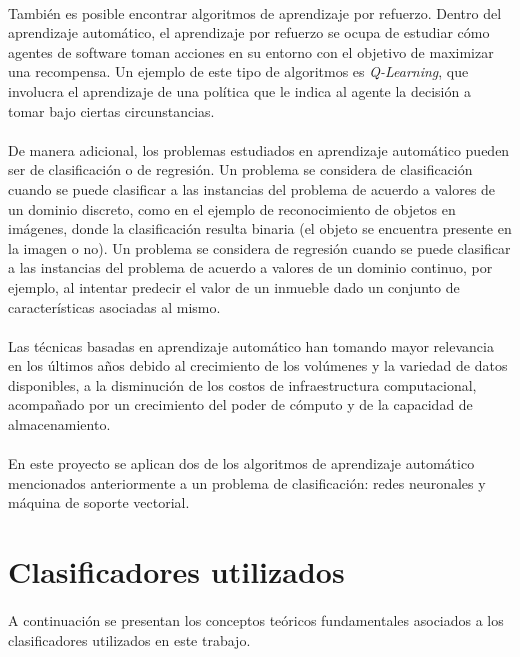 \paragraph{}También es posible encontrar algoritmos de aprendizaje por refuerzo.
Dentro del aprendizaje automático, el aprendizaje por refuerzo se ocupa de estudiar cómo agentes de software toman acciones en su entorno con el objetivo de maximizar una recompensa.
Un ejemplo de este tipo de algoritmos es \textit{Q-Learning}, que involucra el aprendizaje de una política que le indica al agente la decisión a tomar bajo ciertas circunstancias.

\paragraph{}De manera adicional, los problemas estudiados en aprendizaje automático pueden ser de clasificación o de regresión.
Un problema se considera de clasificación cuando se puede clasificar a las instancias del problema de acuerdo a valores de un dominio discreto, como en el ejemplo de reconocimiento de objetos en imágenes, donde la clasificación resulta binaria (el objeto se encuentra presente en la imagen o no).
Un problema se considera de regresión cuando se puede clasificar a las instancias del problema de acuerdo a valores de un dominio continuo, por ejemplo, al intentar predecir el valor de un inmueble dado un conjunto de características asociadas al mismo.

\paragraph{}Las técnicas basadas en aprendizaje automático han tomando mayor relevancia en los últimos años debido al crecimiento de los volúmenes y la variedad de datos disponibles, a la disminución de los costos de infraestructura computacional, acompañado por un crecimiento del poder de cómputo y de la capacidad de almacenamiento.

\paragraph{}En este proyecto se aplican dos de los algoritmos de aprendizaje automático mencionados anteriormente a un problema de clasificación: redes neuronales y máquina de soporte vectorial.

\section{Clasificadores utilizados}

\paragraph{}A continuación se presentan los conceptos teóricos fundamentales asociados a los clasificadores utilizados en este trabajo.





